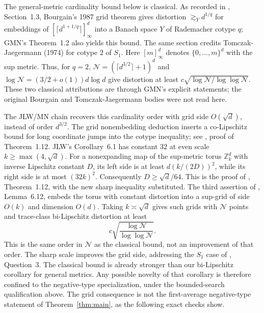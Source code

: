 \documentclass[11pt]{article}
\theoremstyle{remark}\newtheorem{remark}[theorem]{Remark}
\numberwithin{equation}{section}
\begin{document}
The general-metric cardinality bound below is classical. As recorded in
\cite{GMN}, Section~1.3, Bourgain's 1987 grid theorem gives distortion
$\gtrsim_Y d^{1/q}$ for embeddings of $[\lceil d^{1+1/q}\rceil]^d_\infty$
into a Banach space $Y$ of Rademacher cotype $q$; GMN's Theorem~1.2
also yields this bound. The same section credits Tomczak-Jaegermann
(1974) for cotype $2$ of $S_1$. Here $[m]^d_\infty$ denotes
$\{0,\ldots,m\}^d$ with the sup metric. Thus, for $q=2$,
$\mathcal N=(\lceil d^{3/2}\rceil+1)^d$ and
$\log\mathcal N=(3/2+o(1))d\log d$ give distortion at least
$c\sqrt{\log\mathcal N/\log\log\mathcal N}$.
These two classical attributions are through GMN's explicit statements;
the original Bourgain and Tomczak-Jaegermann bodies were not read here.

The JLW/MN chain recovers this cardinality order with grid side
$O(\sqrt d)$, instead of order $d^{3/2}$. The grid nonembedding deduction
inserts a co-Lipschitz bound for long coordinate jumps into the cotype
inequality; see \cite{MN}, proof of Theorem~1.12. JLW's
Corollary~6.1 has constant $32$ at even scale
$k\ge\max(4,\sqrt d)$. For a nonexpanding map of the sup-metric torus
$\mathbb Z_k^d$ with inverse Lipschitz constant $D$, its left side is at
least $d(k/(2D))^2$, while its right side is at most $(32k)^2$.
Consequently $D\ge\sqrt d/64$. This is the proof of
\cite{MN}, Theorem~1.12, with the new sharp inequality substituted.
The third assertion of \cite{MN}, Lemma~6.12, embeds the torus with
constant distortion into a sup-grid of side $O(k)$ and dimension $O(d)$.
Taking $k\asymp\sqrt d$ gives such grids with $\mathcal N$ points and
trace-class bi-Lipschitz distortion at least
\[
 c\sqrt{\frac{\log\mathcal N}{\log\log\mathcal N}}.
\]
This is the same order in $\mathcal N$ as the classical bound, not an
improvement of that order. The sharp scale improves the grid side,
addressing the $S_1$ case of \cite{GMN}, Question~3. The classical bound
is already stronger than our bi-Lipschitz corollary for general metrics. Any possible novelty of that
corollary is therefore confined to the negative-type specialization,
under the bounded-search qualification above. The grid consequence is
not the first-average negative-type statement of
Theorem~\ref{thm:main}, as the following exact checks show.
\end{document}
